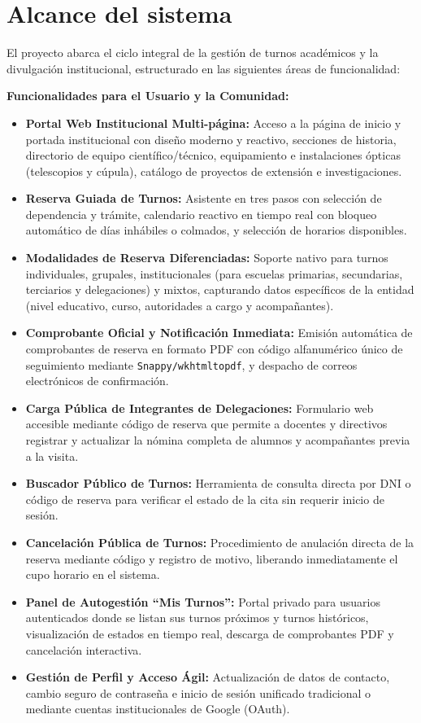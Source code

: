 \section{Alcance del sistema}
El proyecto abarca el ciclo integral de la gestión de turnos académicos y la divulgación institucional, estructurado en las siguientes áreas de funcionalidad:

\textbf{Funcionalidades para el Usuario y la Comunidad:}
\begin{itemize}
    \item \textbf{Portal Web Institucional Multi-página:} Acceso a la página de inicio y portada institucional con diseño moderno y reactivo, secciones de historia, directorio de equipo científico/técnico, equipamiento e instalaciones ópticas (telescopios y cúpula), catálogo de proyectos de extensión e investigaciones.
    \item \textbf{Reserva Guiada de Turnos:} Asistente en tres pasos con selección de dependencia y trámite, calendario reactivo en tiempo real con bloqueo automático de días inhábiles o colmados, y selección de horarios disponibles.
    \item \textbf{Modalidades de Reserva Diferenciadas:} Soporte nativo para turnos individuales, grupales, institucionales (para escuelas primarias, secundarias, terciarios y delegaciones) y mixtos, capturando datos específicos de la entidad (nivel educativo, curso, autoridades a cargo y acompañantes).
    \item \textbf{Comprobante Oficial y Notificación Inmediata:} Emisión automática de comprobantes de reserva en formato PDF con código alfanumérico único de seguimiento mediante \texttt{Snappy/wkhtmltopdf}, y despacho de correos electrónicos de confirmación.
    \item \textbf{Carga Pública de Integrantes de Delegaciones:} Formulario web accesible mediante código de reserva que permite a docentes y directivos registrar y actualizar la nómina completa de alumnos y acompañantes previa a la visita.
    \item \textbf{Buscador Público de Turnos:} Herramienta de consulta directa por DNI o código de reserva para verificar el estado de la cita sin requerir inicio de sesión.
    \item \textbf{Cancelación Pública de Turnos:} Procedimiento de anulación directa de la reserva mediante código y registro de motivo, liberando inmediatamente el cupo horario en el sistema.
    \item \textbf{Panel de Autogestión ``Mis Turnos'':} Portal privado para usuarios autenticados donde se listan sus turnos próximos y turnos históricos, visualización de estados en tiempo real, descarga de comprobantes PDF y cancelación interactiva.
    \item \textbf{Gestión de Perfil y Acceso Ágil:} Actualización de datos de contacto, cambio seguro de contraseña e inicio de sesión unificado tradicional o mediante cuentas institucionales de Google (OAuth).
\end{itemize}

